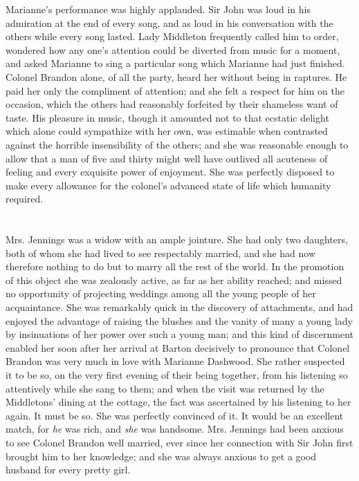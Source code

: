 Marianne's performance was highly applauded. Sir John was loud in his admiration at the end of every song, and as loud in his conversation with the others while every song lasted. Lady Middleton frequently called him to order, wondered how any one's attention could be diverted from music for a moment, and asked Marianne to sing a particular song which Marianne had just finished. Colonel Brandon alone, of all the party, heard her without being in raptures. He paid her only the compliment of attention; and she felt a respect for him on the occasion, which the others had reasonably forfeited by their shameless want of taste. His pleasure in music, though it amounted not to that ecstatic delight which alone could sympathize with her own, was estimable when contrasted against the horrible insensibility of the others; and she was reasonable enough to allow that a man of five and thirty might well have outlived all acuteness of feeling and every exquisite power of enjoyment. She was perfectly disposed to make every allowance for the colonel's advanced state of life which humanity required.

\chapter{} %

Mrs. Jennings was a widow with an ample jointure. She had only two daughters, both of whom she had lived to see respectably married, and she had now therefore nothing to do but to marry all the rest of the world. In the promotion of this object she was zealously active, as far as her ability reached; and missed no opportunity of projecting weddings among all the young people of her acquaintance. She was remarkably quick in the discovery of attachments, and had enjoyed the advantage of raising the blushes and the vanity of many a young lady by insinuations of her power over such a young man; and this kind of discernment enabled her soon after her arrival at Barton decisively to pronounce that Colonel Brandon was very much in love with Marianne Dashwood. She rather suspected it to be so, on the very first evening of their being together, from his listening so attentively while she sang to them; and when the visit was returned by the Middletons' dining at the cottage, the fact was ascertained by his listening to her again. It must be so. She was perfectly convinced of it. It would be an excellent match, for {\em he} was rich, and {\em she} was handsome. Mrs. Jennings had been anxious to see Colonel Brandon well married, ever since her connection with Sir John first brought him to her knowledge; and she was always anxious to get a good husband for every pretty girl.

